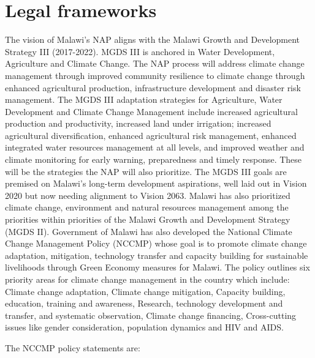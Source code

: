 \documentclass[
]{book}
\begin{document}
\hypertarget{legal-frameworks}{%
\section{Legal frameworks}\label{legal-frameworks}}

The vision of Malawi's NAP aligns with the Malawi Growth and Development Strategy III (2017-2022). MGDS III is anchored in Water Development, Agriculture and Climate Change. The NAP process will address climate change management through improved community resilience to climate change through enhanced agricultural production, infrastructure development and disaster risk management. The MGDS III adaptation strategies for Agriculture, Water Development and Climate Change Management include increased agricultural production and productivity, increased land under irrigation; increased agricultural diversification, enhanced agricultural risk management, enhanced integrated water resources management at all levels, and improved weather and climate monitoring for early warning, preparedness and timely response. These will be the strategies the NAP will also prioritize. The MGDS III goals are premised on Malawi's long-term development aspirations, well laid out in Vision 2020 but now needing alignment to Vision 2063. Malawi has also prioritized climate change, environment and natural resources management among the priorities within priorities of the Malawi Growth and Development Strategy (MGDS II). Government of Malawi has also developed the National Climate Change Management Policy (NCCMP) whose goal is to promote climate change adaptation, mitigation, technology transfer and capacity building for sustainable livelihoods through Green Economy measures for Malawi. The policy outlines six priority areas for climate change management in the country which include: Climate change adaptation, Climate change mitigation, Capacity building, education, training and awareness, Research, technology development and transfer, and systematic observation, Climate change financing, Cross-cutting issues like gender consideration, population dynamics and HIV and AIDS.

The NCCMP policy statements are:
\end{document}
